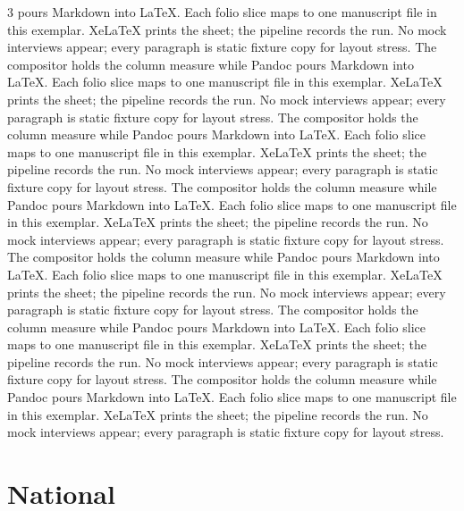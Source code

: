 \documentclass[
]{article}
\begin{document}
\begin{multicols}{3}
pours Markdown into LaTeX. Each folio slice maps to one manuscript file
in this exemplar. XeLaTeX prints the sheet; the pipeline records the
run. No mock interviews appear; every paragraph is static fixture copy
for layout stress. The compositor holds the column measure while Pandoc
pours Markdown into LaTeX. Each folio slice maps to one manuscript file
in this exemplar. XeLaTeX prints the sheet; the pipeline records the
run. No mock interviews appear; every paragraph is static fixture copy
for layout stress. The compositor holds the column measure while Pandoc
pours Markdown into LaTeX. Each folio slice maps to one manuscript file
in this exemplar. XeLaTeX prints the sheet; the pipeline records the
run. No mock interviews appear; every paragraph is static fixture copy
for layout stress. The compositor holds the column measure while Pandoc
pours Markdown into LaTeX. Each folio slice maps to one manuscript file
in this exemplar. XeLaTeX prints the sheet; the pipeline records the
run. No mock interviews appear; every paragraph is static fixture copy
for layout stress. The compositor holds the column measure while Pandoc
pours Markdown into LaTeX. Each folio slice maps to one manuscript file
in this exemplar. XeLaTeX prints the sheet; the pipeline records the
run. No mock interviews appear; every paragraph is static fixture copy
for layout stress. The compositor holds the column measure while Pandoc
pours Markdown into LaTeX. Each folio slice maps to one manuscript file
in this exemplar. XeLaTeX prints the sheet; the pipeline records the
run. No mock interviews appear; every paragraph is static fixture copy
for layout stress. The compositor holds the column measure while Pandoc
pours Markdown into LaTeX. Each folio slice maps to one manuscript file
in this exemplar. XeLaTeX prints the sheet; the pipeline records the
run. No mock interviews appear; every paragraph is static fixture copy
for layout stress.

\end{multicols}

\newpage

\section{National}\label{national}
\end{document}

